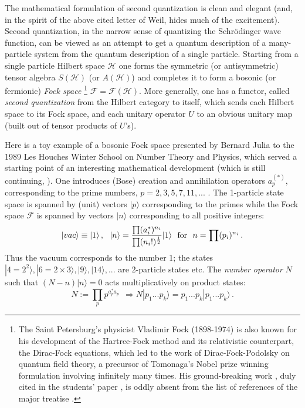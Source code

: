 \documentclass[12pt]{article}
\begin{document}
The mathematical formulation of second quantization is clean and elegant (and, 
in the spirit of the above cited letter of Weil, hides much of the excitement).
 Second quantization, in the narrow sense of quantizing the Schr\"odinger wave 
function, can be viewed as an attempt to get a quantum description of a 
many-particle system from the quantum description of a single particle. Starting
 from a single particle Hilbert space $\mathcal{H}$ one forms the symmetric (or
 antisymmetric) tensor algebra $S(\mathcal{H})$ (or $A(\mathcal{H})$) and 
completes it to form a bosonic (or fermionic) {\it Fock space} \footnote{The 
Saint Petersburg's physicist Vladimir Fock (1898-1974) is also known for his 
development of the Hartree-Fock method and its relativistic counterpart, the 
Dirac-Fock equations, which led to the work of Dirac-Fock-Podolsky on quantum 
field theory, a precursor of Tomonaga's Nobel prize winning formulation 
involving infinitely many times. His ground-breaking work \cite{F32}, duly cited
 in the students' paper \cite{CF09}, is oddly absent from the list of references
 of the major treatise \cite{Sch}.} $\mathcal{F} = \mathcal{F}(\mathcal{H})$. 
More generally, one has a functor, called {\it second quantization} from the
Hilbert category to itself, which sends each Hilbert space to its Fock space, 
and each unitary operator $U$ to an obvious
unitary map (built out of tensor products of $U$'s).

Here is a toy example of a bosonic Fock space presented by Bernard Julia to the 1989 Les Houches Winter School on
Number Theory and Physics, which served a starting point of an interesting
mathematical development \cite{BC} (which is still continuing, \cite{CC}).
One introduces (Bose) creation and annihilation operators $a_p^{(*)}$, corresponding to the prime numbers, $p=2, 3, 5, 
 7, 11, ...$ . The 1-particle state space is spanned by (unit) vectors $|p\rangle$ corresponding to the primes while the Fock 
space $\mathcal{F}$ is spanned by vectors $|n\rangle$ corresponding to all positive integers:
\begin{equation}
\label{JBC}
|vac\rangle\equiv |1\rangle\,, \ \ |n\rangle = \frac{\prod(a_i^*)^{n_i}}{\prod(n_i!)^{\frac{1}{2}}}
|1\rangle \ \ {\rm for} \ \ n = \prod (p_i)^{n_i}\,.
\end{equation}
Thus the vacuum corresponds to the number 1; the states $|4=2^2\rangle, |6=2\times 3\rangle, |9\rangle, |14\rangle, ...$ are 2-particle states etc.
The {\it number operator} $N$ such that $(N-n)|n\rangle = 0$ acts multiplicatively on product states:
\begin{equation}
\label{N}
N:= \prod_p p^{a^*_p a_p} \ \ \Rightarrow N|p_1...p_k\rangle = p_1...p_k |p_1...p_k\rangle\,.
\end{equation}
\end{document}
